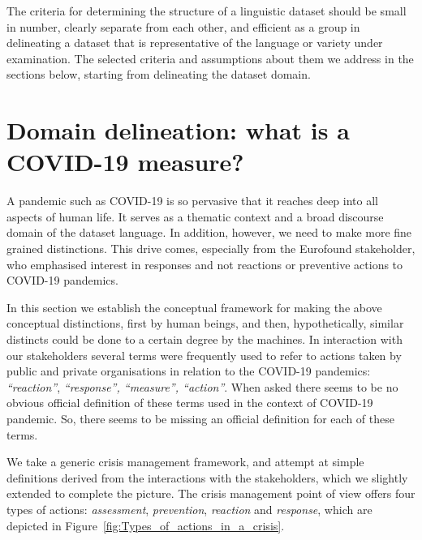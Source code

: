 The criteria for determining the structure of a linguistic dataset should be small in number, clearly separate from each other, and efficient as a group in delineating a dataset that is representative of the language or variety under examination. The selected criteria and assumptions about them we address in the sections below, starting from delineating the dataset domain. 

\section{Domain delineation: what is a COVID-19 measure?}
\label{sec:domain-delimitation}


A pandemic such as COVID-19 is so pervasive that it reaches deep into all aspects of human life. It serves as a thematic context and a broad discourse domain of the dataset language. In addition, however, we need to make more fine grained distinctions. This drive comes, especially from the Eurofound stakeholder, who emphasised interest in responses and not reactions or preventive actions to COVID-19 pandemics. 

In this section we establish the conceptual framework for making the above conceptual distinctions, first by human beings, and then, hypothetically, similar distincts could be done to a certain degree by the machines. 
In interaction with our stakeholders several terms were frequently used to refer to actions taken by public and private organisations in relation to the COVID-19 pandemics: \textit{``reaction''}, \textit{``response'', ``measure'', ``action''}. When asked there seems to be no obvious official definition of these terms used in the context of COVID-19 pandemic. So, there seems to be missing an official definition for each of these terms. 

We take a generic crisis management framework, and attempt at simple definitions derived from the interactions with the stakeholders, which we slightly extended to complete the picture. The crisis management point of view offers four types of actions: \textit{assessment}, \textit{prevention}, \textit{reaction} and \textit{response}, which are depicted in \mbox{Figure \ref{fig:Types_of_actions_in_a_crisis}. }

